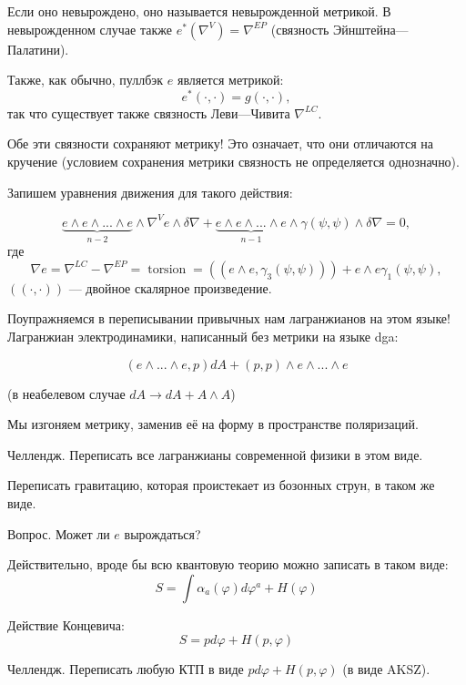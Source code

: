 \documentclass[11pt]{article}
\def\ph{\varphi}
\theoremstyle{remark}
\theoremstyle{definition}
\begin{document}
Если оно невырождено, оно называется невырожденной метрикой. В невырожденном случае также $e^* (\nabla^V) = \nabla^{EP}$ (связность Эйнштейна---Палатини).

Также, как обычно, пуллбэк $e$ является метрикой: $$e^* (\cdot,\cdot) = g(\cdot, \cdot),$$ так что существует также связность Леви---Чивита $\nabla^{LC}.$

Обе эти связности сохраняют метрику! Это означает, что они отличаются на кручение (условием сохранения метрики связность не определяется однозначно).

Запишем уравнения движения для такого действия:

$$ \underbrace{e \wedge e \wedge ... \wedge e}_{n-2} \wedge \nabla^V e \wedge \delta \nabla + \underbrace{e \wedge e \wedge ... \wedge e}_{n-1} \wedge \gamma(\psi, \psi) \wedge \delta \nabla = 0,  $$ где
$$\nabla e = \nabla^{LC} - \nabla^{EP} = \operatorname{torsion} = ((e\wedge e, \gamma_3 (\psi, \psi) )) + e \wedge e \gamma_1 (\psi, \psi),$$ $((\cdot,\cdot))$ --- двойное скалярное произведение.

Поупражняемся в переписывании привычных нам лагранжианов на этом языке! Лагранжиан электродинамики, написанный без метрики на языке dga:

$$(e \wedge ... \wedge e, p) dA + (p,p) \wedge e \wedge ... \wedge e$$

(в неабелевом случае $dA \to dA + A \wedge A$)

Мы изгоняем метрику, заменив её на форму в пространстве поляризаций.

\footnotesize{}
Челлендж. Переписать все лагранжианы современной физики в этом виде.

Переписать гравитацию, которая проистекает из бозонных струн, в таком же виде.

Вопрос. Может ли $e$ вырождаться?
\normalsize{}

Действительно, вроде бы всю квантовую теорию можно записать в таком виде:
$$S = \int \alpha_a (\ph) d\ph^a + H(\ph)$$

Действие Концевича: $$S = p d\ph + H(p, \ph)$$

\footnotesize{}
Челлендж. Переписать любую КТП в виде $p d\ph + H(p, \ph)$ (в виде AKSZ).
\normalsize{}

\bigskip
\bigskip


 
\end{document}
